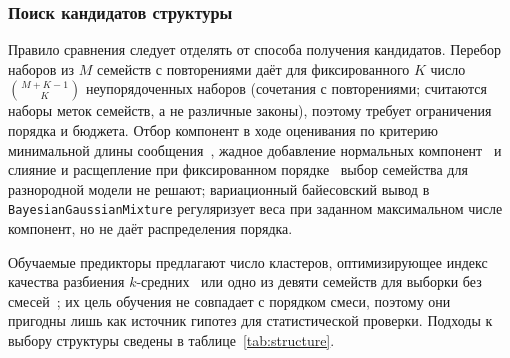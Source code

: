 \subsubsection{Поиск кандидатов структуры}

Правило сравнения следует отделять от способа получения кандидатов. Перебор наборов из $M$ семейств с повторениями даёт для фиксированного $K$ число $\binom{M+K-1}{K}$ неупорядоченных наборов (сочетания с повторениями; считаются наборы меток семейств, а не различные законы), поэтому требует ограничения порядка и бюджета. Отбор компонент в ходе оценивания по критерию минимальной длины сообщения~\cite{FigueiredoJain2002}, жадное добавление нормальных компонент~\cite{Verbeek2003} и слияние и расщепление при фиксированном порядке~\cite{Ueda2000} выбор семейства для разнородной модели не решают; вариационный байесовский вывод в \texttt{BayesianGaussianMixture} регуляризует веса при заданном максимальном числе компонент, но не даёт распределения порядка.

Обучаемые предикторы предлагают число кластеров, оптимизирующее индекс качества разбиения $k$-средних~\cite{Pimentel2020} или одно из девяти семейств для выборки без смесей~\cite{Khoussi2021}; их цель обучения не совпадает с порядком смеси, поэтому они пригодны лишь как источник гипотез для статистической проверки. Подходы к выбору структуры сведены в таблице~\ref{tab:structure}.

